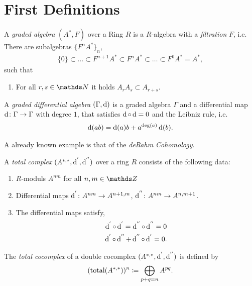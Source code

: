 
\section{First Definitions}

\begin{Def}
	A \textit{graded algebra} $ (A^\ast,F) $ over
	a Ring $ R $ is a $ R $-algebra with a \textit{filtration} $ F $, i.e.
	There are subalgebras $ \{ F^nA^\ast \}_{n} $,
	\begin{gather*}
		\{ 0 \} \subset \ldots \subset F^{n+1}A^\ast \subset F^nA^\ast 
		\subset \ldots \subset F^0A^\ast = A^\ast,
	\end{gather*}
	such that
	\begin{enumerate}[\textbullet]
		\item For all $ r,s\in \N $ it holds $ A_rA_s \subset A_{r+s} $.
	\end{enumerate}
	
	
	A \textit{graded differential algebra} $ (\Gamma,\operatorname{d}) $ is a 
	graded algebra $ \Gamma $ and a differential map $ \operatorname{d} \colon \Gamma \rightarrow \Gamma $ with degree $ 1 $, that satisfies $ \operatorname{d}\circ\operatorname{d} =0 $ and the Leibniz rule, i.e.
	\begin{gather*}
		\operatorname{d} (ab) = \operatorname{d} (a) b + a^{\deg(a)} \operatorname{d} (b).
	\end{gather*}
\end{Def}

\begin{Bsp}
	A already known example is that of the \textit{deRahm Cohomology}.
\end{Bsp}

\begin{Def}
	A \textit{total complex} $ (A^{\ast,\ast},\operatorname{d}^{'},\operatorname{d}^{''}) $ over
	a ring $ R $ consists of the following data:
	\begin{enumerate}[\textbullet]
		\item  $ R $-moduls $ A^{nm} $ for all $ n,m\in\Z $
		\item Differential maps $ \operatorname{d}^{'} \colon A^{nm} \rightarrow A^{n+1,m} $,
		$ \operatorname{d}^{''} \colon A^{nm} \rightarrow A^{n,m+1} $.
		\item The differential maps satisfy, 
		\begin{gather*}
			\operatorname{d}^{'} \circ \operatorname{d}^{'} = \operatorname{d}^{''}\circ\operatorname{d}^{''} = 0\\ \operatorname{d}^{'}\circ\operatorname{d}^{''} + \operatorname{d}^{''}\circ\operatorname{d}^{'} =0 .
		\end{gather*} 
	\end{enumerate}
	
	The \textit{total cocomplex} of a double cocomplex $ (A^{\ast,\ast},\operatorname{d}^{'},\operatorname{d}^{''}) $ is defined by 
	\begin{gather*}
		(\operatorname{total}(A^{\ast,\ast}))^n \coloneqq \bigoplus_{p+q=n} A^{pq}.
	\end{gather*}
\end{Def}

